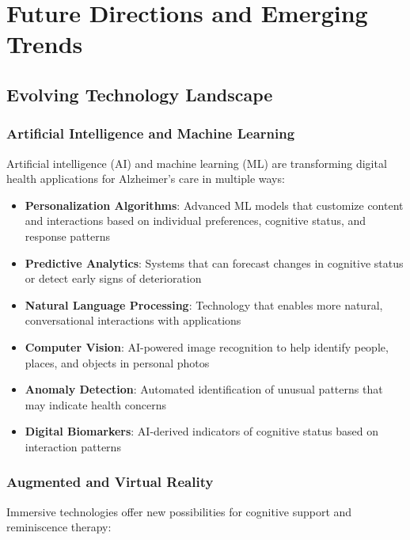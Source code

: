 \chapter{Future Directions and Emerging Trends}

\section{Evolving Technology Landscape}
\subsection{Artificial Intelligence and Machine Learning}
Artificial intelligence (AI) and machine learning (ML) are transforming digital health applications for Alzheimer's care in multiple ways:

\begin{itemize}
    \item \textbf{Personalization Algorithms}: Advanced ML models that customize content and interactions based on individual preferences, cognitive status, and response patterns
    
    \item \textbf{Predictive Analytics}: Systems that can forecast changes in cognitive status or detect early signs of deterioration
    
    \item \textbf{Natural Language Processing}: Technology that enables more natural, conversational interactions with applications
    
    \item \textbf{Computer Vision}: AI-powered image recognition to help identify people, places, and objects in personal photos
    
    \item \textbf{Anomaly Detection}: Automated identification of unusual patterns that may indicate health concerns
    
    \item \textbf{Digital Biomarkers}: AI-derived indicators of cognitive status based on interaction patterns
\end{itemize}

\subsection{Augmented and Virtual Reality}
Immersive technologies offer new possibilities for cognitive support and reminiscence therapy:

